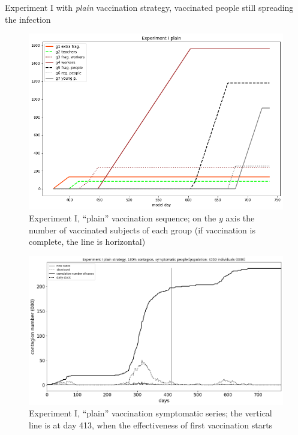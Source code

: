 \documentclass[8pt]{beamer}
\begin{document}
\begin{frame}{Experiment I with \emph{plain} vaccination strategy, vaccinated people still spreading the infection}

\begin{figure}[H]
\center
\includegraphics[scale=0.14]{Experiment_I_plainVaccinationSequence.png} %

\caption{Experiment I, ``plain'' vaccination sequence; on the $y$ axis the number of vaccinated subjects of each group (if vaccination is complete, the line is horizontal)} 
\label{Experiment_I_plainVaccinationSequence}
\end{figure}

\begin{figure}[H]
\center
\includegraphics[scale=0.16]{Experiment_I_1_plain_symptomatic_series.png} 

\caption{Experiment I, ``plain'' vaccination symptomatic series; the vertical line is at day 413, when the effectiveness of first vaccination starts} 
\label{Experiment_I_plainSymptomaticSeries}
\end{figure}



\end{frame}
\end{document}
